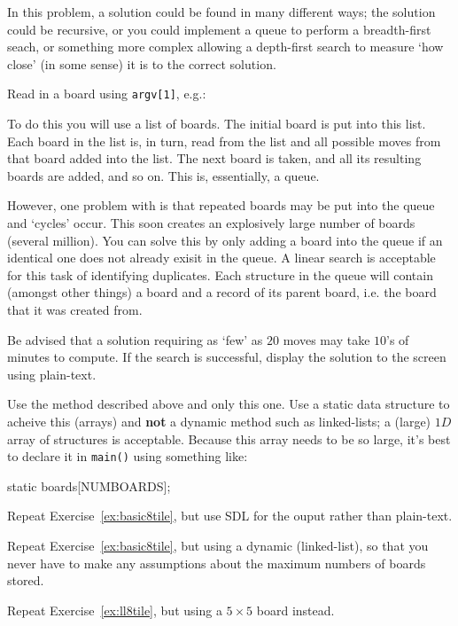 In this problem, a solution could be found in many different ways; the solution could be recursive,
or you could implement a queue to perform a breadth-first seach, or something more complex allowing
a depth-first search to measure `how close' (in some sense) it is to the correct solution. 

\begin{exercise}
\label{ex:basic8tile}
Read in a board using \verb^argv[1]^, e.g.:

To do this you will use a list of boards. The initial board is
put into this list. Each board in the list is, in turn, read from the
list and all possible moves from that board added into the list. The
next board is taken, and all its resulting boards are added, and so
on.  This is, essentially, a queue.

However, one problem with is that repeated boards may be put into the queue and
`cycles' occur.  This soon creates an explosively large number of
boards (several million).  You can solve this by only adding a board
into the queue if an identical one does not already exisit in the queue.
A linear search is acceptable for this task of identifying duplicates.
Each structure in the queue will contain (amongst other things)
a board and a record of its parent board, i.e. the board that it was
created from.

Be advised that a solution requiring as `few' as $20$ moves may take
$10$'s of minutes to compute. If the search is successful, display the solution
to the screen using plain-text.

Use the method described above and only this one. Use a static data structure to acheive
this (arrays) and {\bf not} a dynamic method such as linked-lists; a (large) $1D$ array
of structures is acceptable. Because this array needs to be
so large, it's best to declare it in \verb^main()^ using something like:
\begin{codesnippet}
static boards[NUMBOARDS];
\end{codesnippet}

\end{exercise}

\begin{exercise}
Repeat Exercise~\ref{ex:basic8tile}, but use SDL for the ouput rather than plain-text.
\end{exercise}

\begin{exercise}
\label{ex:ll8tile}
Repeat Exercise~\ref{ex:basic8tile}, but using a dynamic (linked-list), so that you never have to make any assumptions about the maximum numbers of boards stored.
\end{exercise}

\begin{exercise}
Repeat Exercise~\ref{ex:ll8tile}, but using a $5 $ board instead.
\end{exercise}
